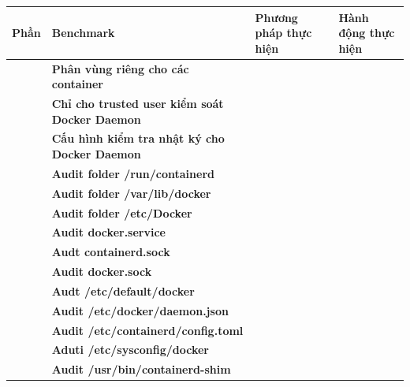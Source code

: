 {\def\LTcaptype{none} %
\begin{longtable}[]{@{}|
  >{\raggedright\arraybackslash}p{}|
  >{\raggedright\arraybackslash}p{}|
  >{\raggedright\arraybackslash}p{}|
  >{\raggedright\arraybackslash}p{}|@{}}
\hline
\begin{minipage}[b]{\linewidth}\raggedright
\textbf{Phần}
\end{minipage} & \begin{minipage}[b]{\linewidth}\raggedright
\textbf{Benchmark}
\end{minipage} & \begin{minipage}[b]{\linewidth}\raggedright
\textbf{Phương pháp thực hiện}
\end{minipage} & \begin{minipage}[b]{\linewidth}\raggedright
\textbf{Hành động thực hiện}
\end{minipage} \\
\hline
\endhead
\multirow{19}{=}{\textbf{1}} & \textbf{Phân vùng riêng cho các container} & & \\
\cline{2-4}
& \textbf{Chỉ cho trusted user kiểm soát Docker Daemon} & & \\
\cline{2-4}
& \textbf{Cấu hình kiểm tra nhật ký cho Docker Daemon} & & \\
\cline{2-4}
& \textbf{Audit folder /run/containerd} & & \\
\cline{2-4}
& \textbf{Audit folder /var/lib/docker} & & \\
\cline{2-4}
& \textbf{Audit folder /etc/Docker} & & \\
\cline{2-4}
& \textbf{Audit docker.service} & & \\
\cline{2-4}
& \textbf{Audt containerd.sock} & & \\
\cline{2-4}
& \textbf{Audit docker.sock} & & \\
\cline{2-4}
& \textbf{Audt /etc/default/docker} & & \\
\cline{2-4}
& \textbf{Audit /etc/docker/daemon.json} & & \\
\cline{2-4}
& \textbf{Audit /etc/containerd/config.toml} & & \\
\cline{2-4}
& \textbf{Aduti /etc/sysconfig/docker} & & \\
\cline{2-4}
& \textbf{Audit /usr/bin/containerd-shim} & & \\

\end{longtable}}
